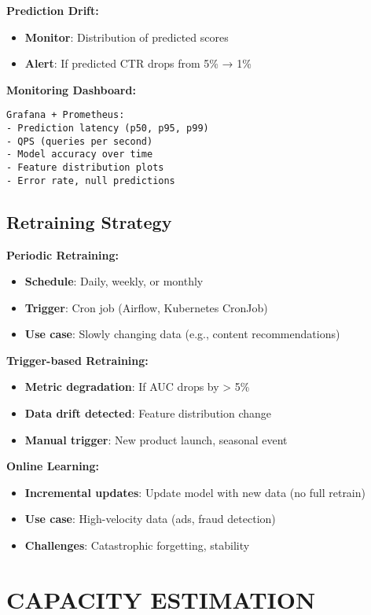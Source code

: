 \documentclass[8pt,landscape]{article}
\begin{document}
\begin{multicols}{3}
\textbf{Prediction Drift:}
\begin{itemize}
\item \textbf{Monitor}: Distribution of predicted scores
\item \textbf{Alert}: If predicted CTR drops from 5\% → 1\%
\end{itemize}

\textbf{Monitoring Dashboard:}
\begin{verbatim}
Grafana + Prometheus:
- Prediction latency (p50, p95, p99)
- QPS (queries per second)
- Model accuracy over time
- Feature distribution plots
- Error rate, null predictions
\end{verbatim}

\subsection*{Retraining Strategy}

\textbf{Periodic Retraining:}
\begin{itemize}
\item \textbf{Schedule}: Daily, weekly, or monthly
\item \textbf{Trigger}: Cron job (Airflow, Kubernetes CronJob)
\item \textbf{Use case}: Slowly changing data (e.g., content recommendations)
\end{itemize}

\textbf{Trigger-based Retraining:}
\begin{itemize}
\item \textbf{Metric degradation}: If AUC drops by > 5\%
\item \textbf{Data drift detected}: Feature distribution change
\item \textbf{Manual trigger}: New product launch, seasonal event
\end{itemize}

\textbf{Online Learning:}
\begin{itemize}
\item \textbf{Incremental updates}: Update model with new data (no full retrain)
\item \textbf{Use case}: High-velocity data (ads, fraud detection)
\item \textbf{Challenges}: Catastrophic forgetting, stability
\end{itemize}

\section*{CAPACITY ESTIMATION}


\end{multicols}
\end{document}
